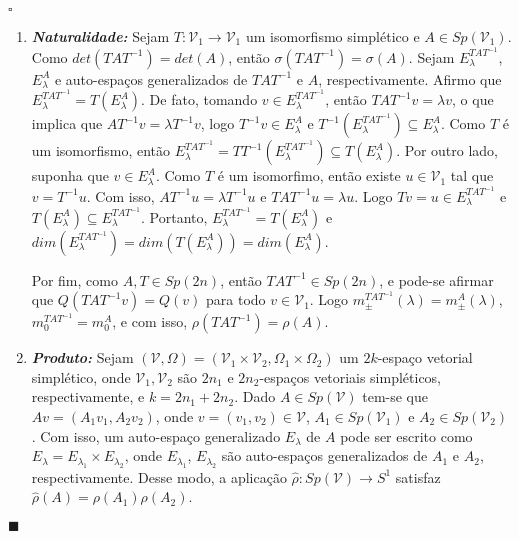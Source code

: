 \documentclass[12pt]{book}
\newenvironment{prova}[1]{$\square$ #1}{\hfill$\blacksquare$}
\newcommand{\autoespaco}[1]{E_{#1}}
\newcommand{\circulo}{S^{1}}
\newcommand{\complexificado}[1]{\mathcal{#1}}
\newcommand{\espectrooperador}[1]{\sigma(#1)}
\newcommand{\gruposimpletico}[1]{Sp(#1)}
\begin{document}
	\begin{prova}
		
		\begin{enumerate}
			\item \label{item_naturalidade_rho} \textbf{\textit{Naturalidade:}} Sejam $T : \complexificado{V}_{1} \to \complexificado{V}_{1}$ um isomorfismo simplético e $A \in \gruposimpletico{\complexificado{V}_{1}}$. Como $det(TAT^{-1}) = det(A)$, então $\espectrooperador{TAT^{-1}} = \espectrooperador{A}$. Sejam $\autoespaco{\lambda}^{TAT^{-1}}$, $\autoespaco{\lambda}^{A}$ e auto-espaços generalizados de $TAT^{-1}$ e $A$, respectivamente. Afirmo que $\autoespaco{\lambda}^{TAT^{-1}} = T(\autoespaco{\lambda}^{A})$. De fato, tomando $v \in \autoespaco{\lambda}^{TAT^{-1}}$, então $TAT^{-1}v = \lambda v$, o que implica que $AT^{-1}v = \lambda T^{-1}v$, logo $T^{-1}v \in \autoespaco{\lambda}^{A}$ e $T^{-1}(\autoespaco{\lambda}^{TAT^{-1}}) \subseteq \autoespaco{\lambda}^{A}$. Como $T$ é um isomorfismo, então $\autoespaco{\lambda}^{TAT^{-1}} = TT^{-1}(\autoespaco{\lambda}^{TAT^{-1}}) \subseteq T(\autoespaco{\lambda}^{A})$. Por outro lado, suponha que $v\in \autoespaco{\lambda}^{A}$. Como $T$ é um isomorfimo, então existe $u \in \complexificado{V}_{1}$ tal que $v=T^{-1}u$. Com isso, $AT^{-1}u = \lambda T^{-1}u$ e $ TAT^{-1}u =\lambda u$. Logo $Tv=u \in \autoespaco{\lambda}^{TAT^{-1}}$ e $T(\autoespaco{\lambda}^{A}) \subseteq \autoespaco{\lambda}^{TAT^{-1}}$. Portanto, $\autoespaco{\lambda}^{TAT^{-1}}=T(\autoespaco{\lambda}^{A}) $ e $dim(\autoespaco{\lambda}^{TAT^{-1}})=dim(T(\autoespaco{\lambda}^{A}) )=dim(\autoespaco{\lambda}^{A})$.
			
			Por fim, como $A,T\in \gruposimpletico{2n}$, então $TAT^{-1}\in \gruposimpletico{2n}$, e pode-se afirmar que $Q(TAT^{-1}v) = Q(v)$ para todo $v \in \complexificado{V}_{1}$. Logo  $m^{TAT^{-1}}_{\pm}(\lambda)=m^{A}_{\pm}(\lambda)$, $m_{0}^{TAT^{-1}}=m_{0}^{A}$, e com isso, $\rho(TAT^{-1})=\rho(A)$.
			
			\item \textbf{\textit{Produto:}} Sejam $(\complexificado{V}, \Omega) = (\complexificado{V}_{1}\times \complexificado{V}_{2}, \Omega_{1}\times \Omega_{2})$ um $2k$-espaço vetorial simplético, onde $\complexificado{V}_{1}, \complexificado{V}_{2}$ são $2n_{1}$ e $2n_{2}$-espaços vetoriais simpléticos, respectivamente, e $k=2n_{1}+2n_{2}$. Dado $A \in \gruposimpletico{\complexificado{V}}$ tem-se que $Av = (A_{1}v_{1}, A_{2}v_{2})$, onde $v=(v_{1}, v_{2}) \in \complexificado{V}$, $A_{1}\in \gruposimpletico{\complexificado{V}_{1}}$ e $A_{2}\in \gruposimpletico{\complexificado{V}_{2}}$. Com isso, um auto-espaço generalizado $E_{\lambda}$ de $A$ pode ser escrito como $E_{\lambda} = E_{\lambda_{1}}\times E_{\lambda_{2}}$, onde $E_{\lambda_{1}}$, $E_{\lambda_{2}}$ são auto-espaços generalizados de $A_{1}$ e $A_{2}$, respectivamente. Desse modo, a aplicação $\hat{\rho}: \gruposimpletico{\complexificado{V}} \to \circulo$ satisfaz $\hat{\rho}(A) = \rho(A_{1})\rho(A_{2})$.
			

\end{enumerate}
\end{prova}
\end{document}
